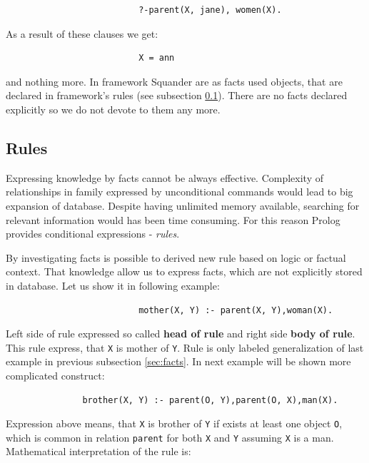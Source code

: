\documentclass[11pt,twoside,a4paper]{book}
\begin{document}
\begin{verbatim}
                          ?-parent(X, jane), women(X).
\end{verbatim}
As a result of these clauses we get:

\begin{verbatim}
                          X = ann
\end{verbatim}
and nothing more. In framework Squander are as facts used objects, that are
declared in framework's rules (see subsection \ref{sec:rules}). There are no
facts declared explicitly so we do not devote to them any more.

\subsection{Rules}
\label{sec:rules}
Expressing knowledge by facts cannot be always effective. Complexity of
relationships in family expressed by unconditional commands would lead to
big expansion of database. Despite having unlimited memory available, searching
for relevant information would has been time consuming. For this reason Prolog
provides conditional expressions - \textit{rules}.

By investigating facts is possible to derived new rule based on logic or
factual context. That knowledge allow us to express facts, which are not
explicitly stored in database. Let us show it in following example:

\begin{verbatim}
                          mother(X, Y) :- parent(X, Y),woman(X).
\end{verbatim}
Left side of rule expressed so called \textbf{head of rule} and right side
\textbf{body of rule}. This rule express, that \verb|X| is mother of \verb|Y|.
Rule is only labeled generalization of last example in previous subsection \ref{sec:facts}.
In next example will be shown more complicated construct:

\begin{verbatim}
               brother(X, Y) :- parent(O, Y),parent(O, X),man(X).
\end{verbatim}
Expression above means, that \verb|X| is brother of \verb|Y| if exists at least
one object \verb|O|, which is common in relation \verb|parent| for both \verb|X|
and \verb|Y| assuming \verb|X| is a man. Mathematical interpretation of the
rule is:
\begin{center}
\end{center}
\end{document}
